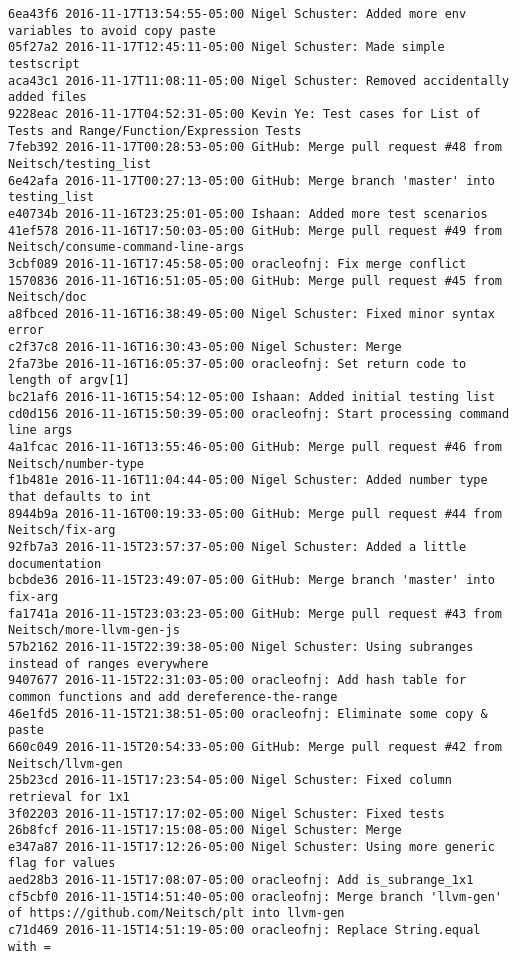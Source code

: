 \begin{lstlisting}
6ea43f6 2016-11-17T13:54:55-05:00 Nigel Schuster: Added more env variables to avoid copy paste
05f27a2 2016-11-17T12:45:11-05:00 Nigel Schuster: Made simple testscript
aca43c1 2016-11-17T11:08:11-05:00 Nigel Schuster: Removed accidentally added files
9228eac 2016-11-17T04:52:31-05:00 Kevin Ye: Test cases for List of Tests and Range/Function/Expression Tests
7feb392 2016-11-17T00:28:53-05:00 GitHub: Merge pull request #48 from Neitsch/testing_list
6e42afa 2016-11-17T00:27:13-05:00 GitHub: Merge branch 'master' into testing_list
e40734b 2016-11-16T23:25:01-05:00 Ishaan: Added more test scenarios
41ef578 2016-11-16T17:50:03-05:00 GitHub: Merge pull request #49 from Neitsch/consume-command-line-args
3cbf089 2016-11-16T17:45:58-05:00 oracleofnj: Fix merge conflict
1570836 2016-11-16T16:51:05-05:00 GitHub: Merge pull request #45 from Neitsch/doc
a8fbced 2016-11-16T16:38:49-05:00 Nigel Schuster: Fixed minor syntax error
c2f37c8 2016-11-16T16:30:43-05:00 Nigel Schuster: Merge
2fa73be 2016-11-16T16:05:37-05:00 oracleofnj: Set return code to length of argv[1]
bc21af6 2016-11-16T15:54:12-05:00 Ishaan: Added initial testing list
cd0d156 2016-11-16T15:50:39-05:00 oracleofnj: Start processing command line args
4a1fcac 2016-11-16T13:55:46-05:00 GitHub: Merge pull request #46 from Neitsch/number-type
f1b481e 2016-11-16T11:04:44-05:00 Nigel Schuster: Added number type that defaults to int
8944b9a 2016-11-16T00:19:33-05:00 GitHub: Merge pull request #44 from Neitsch/fix-arg
92fb7a3 2016-11-15T23:57:37-05:00 Nigel Schuster: Added a little documentation
bcbde36 2016-11-15T23:49:07-05:00 GitHub: Merge branch 'master' into fix-arg
fa1741a 2016-11-15T23:03:23-05:00 GitHub: Merge pull request #43 from Neitsch/more-llvm-gen-js
57b2162 2016-11-15T22:39:38-05:00 Nigel Schuster: Using subranges instead of ranges everywhere
9407677 2016-11-15T22:31:03-05:00 oracleofnj: Add hash table for common functions and add dereference-the-range
46e1fd5 2016-11-15T21:38:51-05:00 oracleofnj: Eliminate some copy & paste
660c049 2016-11-15T20:54:33-05:00 GitHub: Merge pull request #42 from Neitsch/llvm-gen
25b23cd 2016-11-15T17:23:54-05:00 Nigel Schuster: Fixed column retrieval for 1x1
3f02203 2016-11-15T17:17:02-05:00 Nigel Schuster: Fixed tests
26b8fcf 2016-11-15T17:15:08-05:00 Nigel Schuster: Merge
e347a87 2016-11-15T17:12:26-05:00 Nigel Schuster: Using more generic flag for values
aed28b3 2016-11-15T17:08:07-05:00 oracleofnj: Add is_subrange_1x1
cf5cbf0 2016-11-15T14:51:40-05:00 oracleofnj: Merge branch 'llvm-gen' of https://github.com/Neitsch/plt into llvm-gen
c71d469 2016-11-15T14:51:19-05:00 oracleofnj: Replace String.equal with =

\end{lstlisting}
